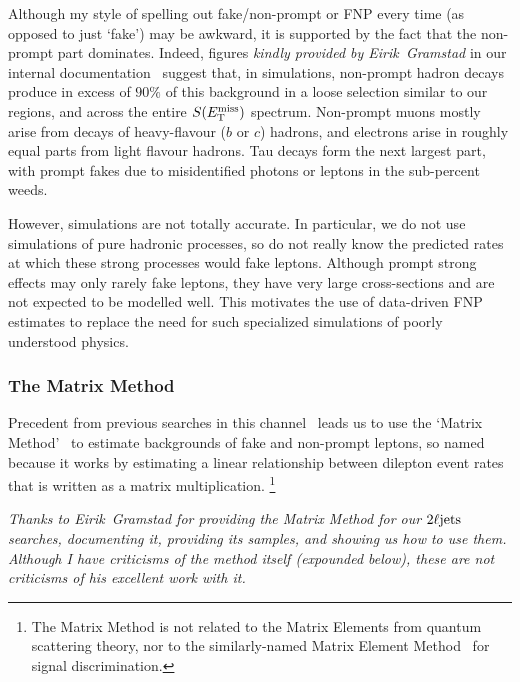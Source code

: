 Although my style of spelling out fake/non-prompt or FNP every time
(as opposed to just `fake') may be awkward, it is supported by the fact that
the non-prompt part dominates.
Indeed, figures \emph{kindly provided by Eirik~Gramstad} in our internal
documentation~\cite{twoljets2018int} suggest that, in simulations, non-prompt
hadron decays produce in excess of $90\%$ of this background in a loose
selection similar to our regions, and across the entire $S(E_\mathrm{T}^\mathrm{miss})$ spectrum.
Non-prompt muons mostly arise from decays of heavy-flavour ($b$ or $c$)
hadrons, and electrons arise in roughly equal parts from light flavour hadrons.
Tau decays form the next largest part, with prompt fakes due to misidentified
photons or leptons in the sub-percent weeds.

However, simulations are not totally accurate.
In particular, we do not use simulations of pure hadronic processes, so do not
really know the predicted rates at which these strong processes would fake
leptons.
Although prompt strong effects may only rarely fake leptons, they have very
large cross-sections and are not expected to be modelled well.
This motivates the use of data-driven FNP estimates to replace the need for
such specialized simulations of poorly understood physics.

\subsubsection{The Matrix Method}
\label{sec:2ljets_matrix_method}
Precedent from previous searches in this channel~\cite{
atlas_2l_SUSY_2013_11,
atlas_23l_SUSY_2016_24
}
leads us to use the `Matrix Method'~\cite{
ATLAS-CONF-2014-058,
D0:1999qdf
}
to estimate backgrounds of fake and non-prompt leptons, so named because it
works by estimating a linear relationship between dilepton event rates that is
written as a matrix multiplication.%
\footnote{%
The Matrix Method is not related to the Matrix Elements from quantum scattering
theory, nor to the similarly-named
Matrix Element Method~\cite{Gainer:2013iya} for signal discrimination.%
}

\emph{
Thanks to Eirik~Gramstad for providing the Matrix Method for our
$2\ell\mathrm{jets}$ searches, documenting it, providing its samples, and showing us how
to use them.
Although I have criticisms of the method itself (expounded below), these
are not criticisms of his excellent work with it.
}

